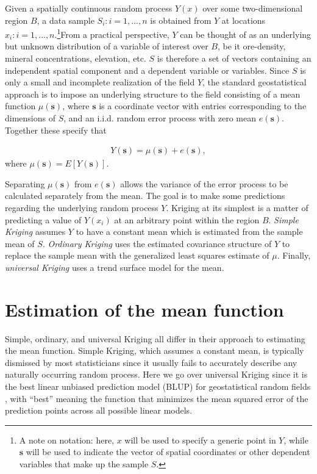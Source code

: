 \documentclass[12pt,twoside]{reedthesis}
\begin{document}
Given a spatially continuous random process $Y(x)$ over some two-dimensional region $B$, a data sample $S_i: i=1, \dots, n$ is obtained from $Y$ at locations $x_i: i=1, \dots, n$.\footnote{A note on notation: here, $x$ will be used to specify a generic point in $Y$, while $\mathbf{s}$ will be used to indicate the vector of spatial coordinates or other dependent variables that make up the sample $S$.}From a practical perspective, $Y$ can be thought of as an underlying but unknown distribution of a variable of interest over $B$, be it ore-density, mineral concentrations, elevation, etc. $S$ is therefore a set of vectors containing an independent spatial component and a dependent variable or variables. Since $S$ is only a small and incomplete realization of the field $Y$, the standard geostatistical approach is to impose an underlying structure to the field consisting of a mean function $\mu(\mathbf{s})$, where $\mathbf{s}$ is a coordinate vector with entries corresponding to the dimensions of $S$, and an i.i.d. random error process with zero mean $e(\mathbf{s})$. Together these specify that

\begin{align*}
Y(\mathbf{s}) = \mu(\mathbf{s}) + e(\mathbf{s}),
\end{align*} 
where $\mu(\mathbf{s}) = E[Y(\mathbf{s})]$.
  

Separating $\mu(\mathbf{s})$ from $e(\mathbf{s})$ allows the variance of the error process to be calculated separately from the mean. The goal is to make some predictions regarding the underlying random process $Y$. Kriging at its simplest is a matter of predicting a value of $Y(x_i)$ at an arbitrary point within the region $B$. \emph{Simple Kriging} assumes $Y$ to have a constant mean which is estimated from the sample mean of $S$. \emph{Ordinary Kriging} uses the estimated covariance structure of $Y$ to replace the sample mean with the generalized least squares estimate of $\mu$. Finally, \emph{universal Kriging} uses a trend surface model for the mean. 

\section{Estimation of the mean function}

Simple, ordinary, and universal Kriging all differ in their approach to estimating the mean function. Simple Kriging, which assumes a constant mean, is typically dismissed by most statisticians since it usually fails to accurately describe any naturally occurring random process. Here we go over universal Kriging since it is the best linear unbiased prediction model (BLUP) for geostatistical random fields \cite{gelfand:2010}, with ``best'' meaning the function that minimizes the mean squared error of the prediction points across all possible linear models. 
\end{document}
